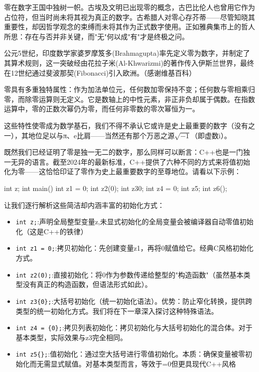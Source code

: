 
零在数字王国中独树一帜。古埃及文明已出现零的概念，古巴比伦人也曾用它作为占位符，但当时尚未将其视为真正的数字。古希腊人对零心存芥蒂——尽管知晓其重要性，却因哲学观念的束缚而未将其作为正式数字使用。正如雅典集市上的哲人所思：存在与否并非关键，而"无"何以成"有"才是终极之问。

公元5世纪，印度数学家婆罗摩笈多(Brahmagupta)率先定义零为数字，并制定了其算术规则，这一突破经由花拉子米(Al-Khwarizmi)的著作传入伊斯兰世界，最终在12世纪通过斐波那契(Fibonacci)引入欧洲。（感谢维基百科）

零具有多重独特属性：作为加法单位元，任何数加零保持不变；任何数与零相乘归零，而除零运算则无定义。它是数轴上的中性元素，非正非负却属于偶数。在指数运算中，零的正数次幂仍为零，而任何非零数的零次幂恒为一。

这些特性使零成为数学基石，我们不得不承认它或许是史上最重要的数字（没有之一），其地位足以与π、e比肩——当然还有那个万恶之源$\sqrt{-1}$（即虚数i）。

既然我们已经证明了零是独一无二的数字，那么同样可以断言：C++也是一门独一无异的语言。截至2024年的最新标准，C++提供了六种不同的方式来将值初始化为零——这恰恰印证了零作为史上最重要数字的至尊地位。请看以下示例：

\begin{cpp}
int z;
int main()
{
  int z1 = 0;
  int z2(0);
  int z3{0};
  int z4 = {0};
  int z5{};
  int z6();
}
\end{cpp}

让我们逐行解析这些简洁却内涵丰富的初始化方式：

\begin{itemize}
\item 
\verb|int z;|:声明全局整型变量z,未显式初始化的全局变量会被编译器自动零值初始化（这是C++的铁律）

\item 
\verb|int z1 = 0;|:拷贝初始化：先创建变量z1，再将0赋值给它。经典C风格初始化方式。

\item 
\verb|int z2(0);|:直接初始化：将0作为参数传递给整型的"构造函数"（虽然基本类型没有真正的构造函数，但语法形式如此）。

\item 
\verb|int z3{0};|:大括号初始化（统一初始化语法）。优势：防止窄化转换，提供跨类型的统一初始化方式。我们将在下一章深入探讨这种特殊语法。

\item 
\verb|int z4 = {0};|:拷贝列表初始化：拷贝初始化与大括号初始化的混合体。对于基本类型，实际效果与z3完全相同。

\item 
\verb|int z5{};|:值初始化：通过空大括号{}进行零值初始化。本质：确保变量被零初始化而无需显式赋值。对基本类型而言，等效于=0但更具现代C++风格
\end{itemize}

